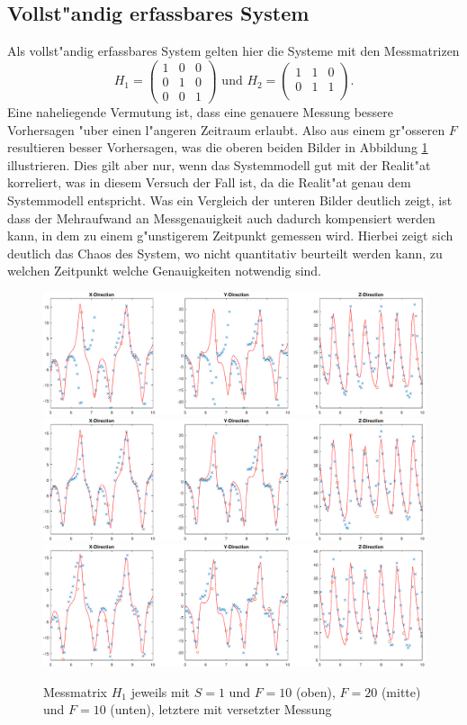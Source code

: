 \begin{refsection}
\subsection{Vollst"andig erfassbares System}
Als vollst"andig erfassbares System gelten hier die Systeme mit den Messmatrizen
\[
H_{1}=\begin{pmatrix}
1 & 0 & 0 \\ 
0 & 1 & 0 \\ 
0 & 0 & 1
\end{pmatrix} 
\text{ und }
H_{2}=\begin{pmatrix}
1 & 1 & 0 \\ 
0 & 1 & 1 \\ 
\end{pmatrix}
\text{.}
\]
Eine naheliegende Vermutung ist, dass eine genauere Messung bessere Vorhersagen "uber einen l"angeren Zeitraum erlaubt. Also aus einem gr"osseren $F$ resultieren besser Vorhersagen, was die oberen beiden Bilder in Abbildung \ref{kalman:H1S1} illustrieren. Dies gilt aber nur, wenn das Systemmodell gut mit der Realit"at korreliert, was in diesem Versuch der Fall ist, da die Realit"at genau dem Systemmodell entspricht.
Was ein Vergleich der unteren Bilder deutlich zeigt, ist dass der Mehraufwand an Messgenauigkeit auch dadurch kompensiert werden kann, in dem zu einem g"unstigerem Zeitpunkt gemessen wird. Hierbei zeigt sich deutlich das Chaos des System, wo nicht quantitativ beurteilt werden kann, zu welchen Zeitpunkt welche Genauigkeiten notwendig sind.
\begin{figure}
\centering
\includegraphics[width=\hsize]{kalman/figures/H1R10S1.pdf}
\includegraphics[width=\hsize]{kalman/figures/H1R20S1.pdf}
\includegraphics[width=\hsize]{kalman/figures/H1R10S1aS.pdf}
\caption{Messmatrix $H_{1}$ jeweils mit $S=1$ und $F=10$ (oben), $F=20$ (mitte) und $F=10$ (unten), letztere mit versetzter Messung}
\label{kalman:H1S1}
\end{figure}


\end{refsection}
